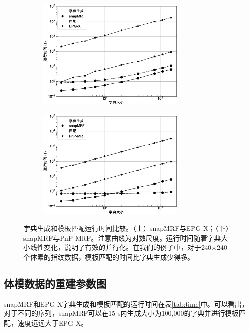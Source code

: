 \begin{figure}
\centering
\begin{subfigure}
 \centering
 \includegraphics[width=0.8\textwidth]{img/snapmrf/time_vs_epgx.eps}
\end{subfigure}
\begin{subfigure}
 \centering
 \includegraphics[width=0.8\textwidth]{img/snapmrf/time_vs_pnp.eps}
\end{subfigure}
\caption{字典生成和模板匹配运行时间比较。（上）snapMRF与EPG-X；（下）snapMRF与PnP-MRF。注意曲线为对数尺度。运行时间随着字典大小线性变化，说明了有效的并行化。在我们的例子中，对于240$\times$240个体素的指纹数据，模板匹配的时间比字典生成少得多。}
\label{fig:time}
\end{figure}

\subsection{体模数据的重建参数图}
snapMRF和EPG-X字典生成和模板匹配的运行时间在表\ref{tab:time}中。可以看出，对于不同的序列，snapMRF可以在15 s内生成大小为100,000的字典并进行模板匹配，速度远远大于EPG-X。

